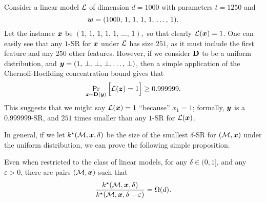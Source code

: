 

\begin{example}
Consider a linear model $\mathcal{L}$ of dimension $d= 1000$ with parameters $t = 1250$ and
$$
	{\bm{w}} = (
		1000, \, 1, \, 1, \,  1, \,  1, \,  \ldots, \, 1
	).
$$
Let the instance ${\bm{x}}$ be 
	$(
		1, \, 1, \, 1, \,  1, \,  1, \,  \ldots, \, 1
	),$ so that clearly $\mathcal{L}({\bm{x}}) = 1$.
One can easily see that any $1$-SR for ${\bm{x}}$ under $\mathcal{L}$ has size $251$, as it must include the first feature and any $250$ other features.
However, if we consider $\mathbf{D}$ to be a uniform distribution, and ${\bm{y}} = (
		1, \, \bot, \, \bot, \,  \bot,  \ldots, \, \bot
	)$, then a simple application of the Chernoff-Hoeffding concentration bound gives that
\[
	\Pr_{{\bm{z}} \sim \mathbf{D}({\bm{y}})}\Big[ \mathcal{L}({\bm{z}}) = 1\Big] \geq  0.999999.\]
	This suggests that we might say $\mathcal{L}({\bm{x}}) = 1$ ``because'' $x_1 = 1$; formally, ${\bm{y}}$ is a $0.999999$-SR, and $251$ times smaller than any $1$-SR for $\mathcal{L}({\bm{x}})$.
\label{ex:delta-sr-size}
\end{example}

In general, if we let $k^\star(\mathcal{M}, {\bm{x}}, \delta)$ be the size of the smallest $\delta$-SR for $(\mathcal{M}, {\bm{x}})$ under the uniform distribution, we can prove the following simple proposition.

\begin{proposition}
	Even when restricted to the class of linear models, for any $\delta \in (0, 1]$, and any $\varepsilon > 0$, there are pairs $(\mathcal{M}, {\bm{x}})$  such that
	\[ 
		\frac{k^\star(\mathcal{M}, {\bm{x}}, \delta)}{k^\star(\mathcal{M}, {\bm{x}}, \delta-\varepsilon)} = \Omega(d).
	\]
\end{proposition}
